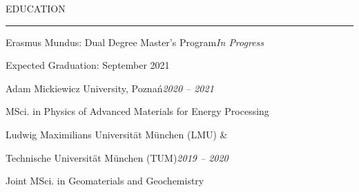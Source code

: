 \documentclass{short_resume} %
\renewenvironment{rSection}[1]{
	\sectionskip
	\textcolor{RoyalPurple}{\MakeUppercase{#1}}
	\sectionlineskip
	\hrule
	\begin{list}{}{
			\setlength{\leftmargin}{1.5em}
		}
		\item[]
	}{
	\end{list}
}
\begin{document}
	
	
	\vspace{-2.5em}
	\begin{rSection}{Education} 
		\begin{rSubsection}{Erasmus Mundus: Dual Degree Master's Program}{\em In Progress}{}{}
			\vspace{-.4em}
			\item[] Expected Graduation: September 2021
			\vspace{-1em}
		\end{rSubsection}
		\begin{rSubsection}{\hspace{.04\textwidth} Adam Mickiewicz University, Pozna\'n}{\em 2020 -- 2021}{}{}
			\vspace{-.4em}
			\item[] \hspace{.04\textwidth} MSci. in Physics of Advanced Materials for Energy Processing
		\end{rSubsection}
		\vspace{-1em}
		\begin{rSubsection}{\hspace{.04\textwidth} Ludwig Maximilians Universit{\"a}t  M{\"u}nchen (LMU) \&}{}{}{}
			\item[] \vspace{-2.75em}
		\end{rSubsection}
		\begin{rSubsection}{\hspace{.04\textwidth} Technische Universit{\"a}t M{\"u}nchen (TUM)}{\em 2019 -- 2020}{}{}
			\vspace{-.4em}
			\item[] \hspace{.04\textwidth} Joint MSci. in Geomaterials and Geochemistry
		\end{rSubsection}


\end{rSection}
\end{document}
